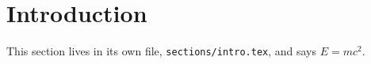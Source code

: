 \section{Introduction}\label{sec:intro}
This section lives in its own file, \texttt{sections/intro.tex}, and says $E = mc^2$.
